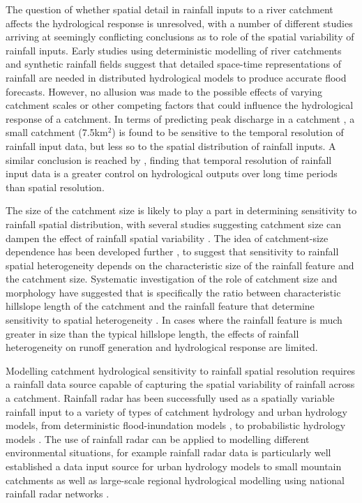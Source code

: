 The question of whether spatial detail in rainfall inputs to a river catchment affects the hydrological response is unresolved, with a number of different studies arriving at seemingly conflicting conclusions as to role of the spatial variability of rainfall inputs. Early studies using deterministic modelling of river catchments and synthetic rainfall fields \citep{wilson1979influence} suggest that detailed space-time representations of rainfall are needed in distributed hydrological models to produce accurate flood forecasts. However, no allusion was made to the possible effects of varying catchment scales or other competing factors that could influence the hydrological response of a catchment. In terms of predicting peak discharge in a catchment \citep{krajewski1991monte}, a small catchment (7.5km\(^2\)) is found to be sensitive to the temporal resolution of rainfall input data, but less so to the spatial distribution of rainfall inputs. A similar conclusion is reached by \citet{coulthard2016sensitivity}, finding that temporal resolution of rainfall input data is a greater control on hydrological outputs over long time periods than spatial resolution. 

The size of the catchment size is likely to play a part in determining sensitivity to rainfall spatial distribution, with several studies suggesting catchment size can dampen the effect of rainfall spatial variability \citep{segond2007simulation,nicotina2008impact}. The idea of catchment-size dependence has been developed further \citep{gabellani2007propagation}, to suggest that sensitivity to rainfall spatial heterogeneity depends on the characteristic size of the rainfall feature and the catchment size. Systematic investigation of the role of catchment size and morphology have suggested that is specifically the ratio between characteristic hillslope length of the catchment and the rainfall feature that determine sensitivity to spatial heterogeneity \citep{nicotina2008impact}. In cases where the rainfall feature is much greater in size than the typical hillslope length, the effects of rainfall heterogeneity on runoff generation and hydrological response are limited. 

Modelling catchment hydrological sensitivity to rainfall spatial resolution requires a rainfall data source capable of capturing the spatial variability of rainfall across a catchment. Rainfall radar has been successfully used as a spatially variable rainfall input to a variety of types of catchment hydrology and urban hydrology models, from deterministic flood-inundation models \citep[e.g][]{coulthard2016sensitivity}, to probabilistic hydrology models \citep{bell2000sensitivity,cole2008hydrological}. The use of rainfall radar can be applied to modelling different environmental situations, for example rainfall radar data is particularly well established a data input source for urban hydrology models \citep{berne2004temporal,einfalt2004towards,thorndahl2014analyses} to small mountain catchments \citep{borga2000use} as well as large-scale regional hydrological modelling using national rainfall radar networks \citep{knebl2005regional}.

